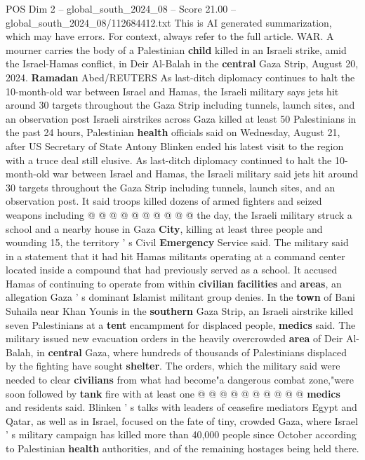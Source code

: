 \begin{textsample}{POS Dim 2 – global\_south\_2024\_08 – Score 21.00 – global\_south\_2024\_08/112684412.txt}  \label{ex:f2_pos_337}
This is AI generated summarization, which may have errors.
For context, always refer to the full article.
WAR.
A mourner carries the body of a Palestinian \textbf{child} killed in an Israeli strike, amid the Israel-Hamas conflict, in Deir Al-Balah in the \textbf{central} Gaza Strip, August 20, 2024. \textbf{Ramadan} Abed/REUTERS As last-ditch diplomacy continues to halt the 10-month-old war between Israel and Hamas, the Israeli military says jets hit around 30 targets throughout the Gaza Strip including tunnels, launch sites, and an observation post Israeli airstrikes across Gaza killed at least 50 Palestinians in the past 24 hours, Palestinian \textbf{health} officials said on Wednesday, August 21, after US Secretary of State Antony Blinken ended his latest visit to the region with a truce deal still elusive.
As last-ditch diplomacy continued to halt the 10-month-old war between Israel and Hamas, the Israeli military said jets hit around 30 targets throughout the Gaza Strip including tunnels, launch sites, and an observation post.
It said troops killed dozens of armed fighters and seized weapons including @ @ @ @ @ @ @ @ @ @ the day, the Israeli military struck a school and a nearby house in Gaza \textbf{City}, killing at least three people and wounding 15, the territory ' s Civil \textbf{Emergency} Service said.
The military said in a statement that it had hit Hamas militants operating at a command center located inside a compound that had previously served as a school.
It accused Hamas of continuing to operate from within \textbf{civilian} \textbf{facilities} and \textbf{areas}, an allegation Gaza ' s dominant Islamist militant group denies.
In the \textbf{town} of Bani Suhaila near Khan Younis in the \textbf{southern} Gaza Strip, an Israeli airstrike killed seven Palestinians at a \textbf{tent} encampment for displaced people, \textbf{medics} said.
The military issued new evacuation orders in the heavily overcrowded \textbf{area} of Deir Al-Balah, in \textbf{central} Gaza, where hundreds of thousands of Palestinians displaced by the fighting have sought \textbf{shelter}.
The orders, which the military said were needed to clear \textbf{civilians} from what had become"a dangerous combat zone,"were soon followed by \textbf{tank} fire with at least one @ @ @ @ @ @ @ @ @ @ \textbf{medics} and residents said.
Blinken ' s talks with leaders of ceasefire mediators Egypt and Qatar, as well as in Israel, focused on the fate of tiny, crowded Gaza, where Israel ' s military campaign has killed more than 40,000 people since October according to Palestinian \textbf{health} authorities, and of the remaining hostages being held there.

\end{textsample}
